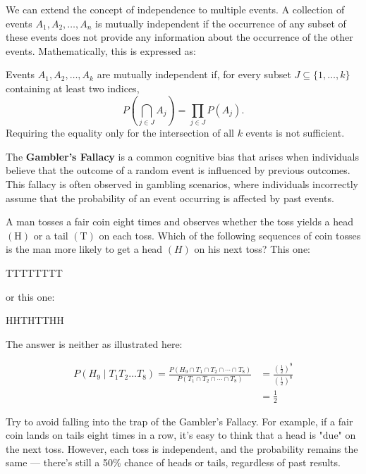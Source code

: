 We can extend the concept of independence to multiple events. A collection of events \( A_1, A_2, \ldots, A_n \) is mutually independent if the occurrence of any subset of these events does not provide any information about the occurrence of the other events. Mathematically, this is expressed as:

\begin{definition}
    Events \( A_1, A_2, \ldots, A_k \) are mutually independent if, for every subset \(J\subseteq\{1,\ldots,k\}\) containing at least two indices,
    \[
    P\left(\bigcap_{j\in J}A_j\right)=\prod_{j\in J}P(A_j).
    \]
    Requiring the equality only for the intersection of all \(k\) events is not sufficient.
\end{definition}

\begin{example}\par

The \textbf{Gambler's Fallacy }is a common cognitive bias that arises when individuals believe that the outcome of a random event is influenced by previous outcomes. This fallacy is often observed in gambling scenarios, where individuals incorrectly assume that the probability of an event occurring is affected by past events.

A man tosses a fair coin eight times and observes whether the toss yields a head $(\mathrm{H})$ or a tail $(\mathrm{T})$ on each toss. Which of the following sequences of coin tosses is the man more likely to get a head $(H)$ on his next toss? This one:

TTTTTTTT

or this one:

HHTHTTHH

The answer is neither as illustrated here:

\begin{align*}
        P\left(H_9 \mid T_1 T_2 \ldots T_8\right)=\frac{P\left(H_9 \cap T_1 \cap T_2 \cap \cdots \cap T_8\right)}{P\left(T_1 \cap T_2 \cap \cdots \cap T_8\right)} & =\frac{\left(\frac{1}{2}\right)^9}{\left(\frac{1}{2}\right)^8} \\
        & =\frac{1}{2}
\end{align*}

\end{example}

Try to avoid falling into the trap of the Gambler's Fallacy. For example, if a fair coin lands on tails eight times in a row, it’s easy to think that a head is "due" on the next toss. However, each toss is independent, and the probability remains the same — there’s still a 50\% chance of heads or tails, regardless of past results.

